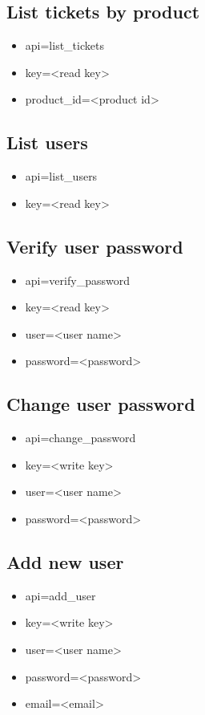 \documentclass[11pt]{article}
\begin{document}
\subsection{List tickets by product}

\begin{itemize}
\item api=list\_tickets
\item key=<read key>
\item product\_id=<product id>
\end{itemize}

\subsection{List users}

\begin{itemize}
\item api=list\_users
\item key=<read key>
\end{itemize}

\subsection{Verify user password}

\begin{itemize}
\item api=verify\_password
\item key=<read key>
\item user=<user name>
\item password=<password>
\end{itemize}

\subsection{Change user password}

\begin{itemize}
\item api=change\_password
\item key=<write key>
\item user=<user name>
\item password=<password>
\end{itemize}

\subsection{Add new user}

\begin{itemize}
\item api=add\_user
\item key=<write key>
\item user=<user name>
\item password=<password>
\item email=<email>
\end{itemize}
\end{document}
